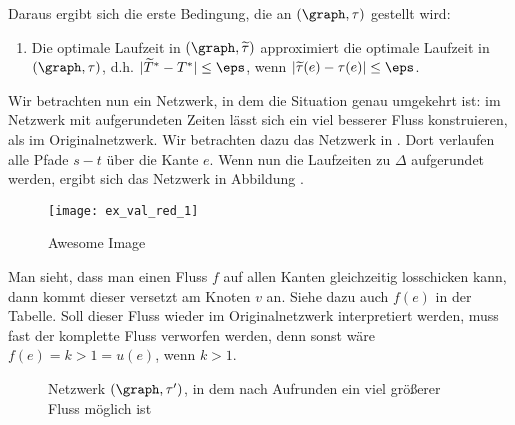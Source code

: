 Daraus ergibt sich die erste Bedingung, die an $(\graph, \tau)$ gestellt wird:
\begin{framed}
\begin{enumerate}[label={(A\arabic*)}]
    \item Die optimale Laufzeit in $(\graph, \widetilde{\tau})$ approximiert
        die optimale Laufzeit in $(\graph, \tau)$,
        d.h. $|\widetilde{T}^* - T^*| \leq \eps$,
        wenn $|\widetilde{\tau}(e) - \tau(e)| \leq \eps$. \label{a1}
\end{enumerate}
\end{framed}

\begin{example}

    Wir betrachten nun ein Netzwerk, in dem die Situation genau umgekehrt ist:
    im Netzwerk mit aufgerundeten Zeiten lässt sich ein viel besserer Fluss
    konstruieren, als im Originalnetzwerk. Wir betrachten dazu das Netzwerk
    in . Dort verlaufen alle Pfade $s-t$ über die
    Kante $e$. Wenn nun die Laufzeiten zu $\Delta$ aufgerundet werden,
    ergibt sich das Netzwerk in Abbildung .

    \begin{figure}[H]
    \centering
    \texttt{[image: ex\_val\_red\_1]}
    \caption{Awesome Image}
    \label{fig:ex_val_red_1}
    \end{figure}
    
    Man sieht, dass man einen Fluss $f$ auf allen Kanten gleichzeitig losschicken
    kann, dann kommt dieser versetzt am Knoten $v$ an. Siehe dazu auch
    $f(e)$ in der Tabelle. Soll dieser Fluss wieder im Originalnetzwerk
    interpretiert werden, muss fast der komplette Fluss verworfen werden, denn
    sonst wäre $f(e) = k > 1 = u(e)$, wenn $k > 1$.
    
    \begin{figure}[H]
    \subfloat{\usebox{\tempbox}}%
    \qquad
      \caption{Netzwerk $(\graph, \tau')$, in dem nach Aufrunden ein viel größerer
        Fluss möglich ist}\label{fig:ex_val_red_2}
    \end{figure}    
\end{example}

